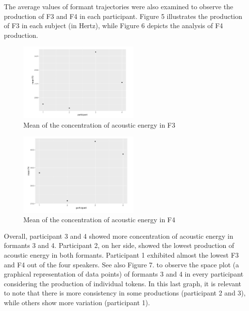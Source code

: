 \documentclass[
  a4paper,
  11pt,
  twocolumn]{article}
\begin{document}
The average values of formant trajectories were also examined to observe
the production of F3 and F4 in each participant. Figure 5 illustrates
the production of F3 in each subject (in Hertz), while Figure 6 depicts
the analysis of F4 production.

\begin{figure}[!ht]
\begin{center}
\includegraphics[width=6cm]{./includes/figures/graph1.png}
\caption{Mean of the concentration of acoustic energy in F3}\label{fig:vowels}
\end{center}
\end{figure}

\begin{figure}[!ht]
\begin{center}
\includegraphics[width=6cm]{./includes/figures/graph2.png}
\caption{Mean of the concentration of acoustic energy in F4}\label{fig:vowels}
\end{center}
\end{figure}

Overall, participant 3 and 4 showed more concentration of acoustic
energy in formants 3 and 4. Participant 2, on her side, showed the
lowest production of acoustic energy in both formants. Participant 1
exhibited almost the lowest F3 and F4 out of the four speakers. See also
Figure 7. to observe the space plot (a graphical representation of data
points) of formants 3 and 4 in every participant considering the
production of individual tokens. In this last graph, it is relevant to
note that there is more consistency in some productions (participant 2
and 3), while others show more variation (participant 1).
\end{document}
